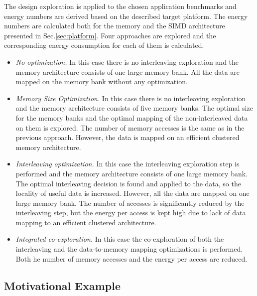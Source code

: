 \documentclass[prodmode,acmtecs]{acmsmall}
\begin{document}
The design exploration is applied to the chosen application benchmarks and energy numbers are derived based on the described target platform.
The energy numbers are calculated both for the memory and the SIMD architecture presented in Sec.\ref{sec:platform}.
Four approaches are explored and the corresponding energy consumption for each of them is calculated.

\begin{itemize}
\item \textit{No optimization.} 
In this case there is no interleaving exploration and the memory architecture consists of one large memory bank. All the data are mapped on the memory bank without any optimization. 
\item \textit{Memory Size Optimization.} 
In this case there is no interleaving exploration and the memory architecture consists of five memory banks.
The optimal size for the memory banks and the optimal mapping of the non-interleaved data on them is explored. 
The number of memory accesses is the same as in the previous approach.
However, the data is mapped on an efficient clustered memory architecture.
\item \textit{Interleaving optimization.} 
In this case the  interleaving exploration step is performed and the memory architecture consists of one large memory bank.
The optimal interleaving decision is found and applied to the data, so the locality of useful data is increased.
However, all the data are mapped on one large memory bank.
The number of accesses is significantly reduced by the interleaving step, but the energy per access is kept high due to lack of data mapping to an efficient clustered architecture.
\item \textit{Integrated co-exploration.} 
In this case the co-exploration of both the interleaving and the data-to-memory mapping optimizations is performed.
Both he number of memory accesses and the energy per access are reduced.
\end{itemize}

\subsection{Motivational Example}
\end{document}

